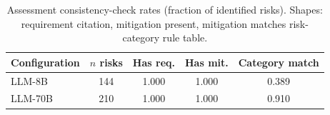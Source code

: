 \begin{table}[htbp]
\centering
\caption{Assessment consistency-check rates (fraction of identified risks).
Shapes: requirement citation, mitigation present, mitigation matches risk-category rule table.}
\label{tab:consistency_check}
\begin{tabular}{lcccc}
\toprule
Configuration & $n$ risks & Has req. & Has mit. & Category match \\
\midrule
LLM-8B & 144 & 1.000 & 1.000 & 0.389 \\
LLM-70B & 210 & 1.000 & 1.000 & 0.910 \\
\bottomrule
\end{tabular}
\end{table}
